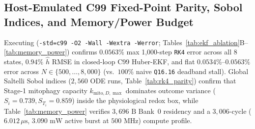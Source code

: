 \documentclass[11pt]{article}
\theoremstyle{plain}
\theoremstyle{remark}
\begin{document}
\subsection{Host-Emulated C99 Fixed-Point Parity, Sobol Indices, and Memory/Power Budget}
Executing  (\texttt{-std=c99 -O2 -Wall -Wextra -Werror}; Tables~\ref{tab:ekf_ablation}B--\ref{tab:memory_power}) confirms $0.0563\%$ max 1,000-step \texttt{RK4} error across all 8 states, $0.94\%$ $\hat{h}$ RMSE in closed-loop C99 Huber-EKF, and flat $0.0534\%\text{--}0.0563\%$ error across $N \in \{500, \dots, 8{,}000\}$ (vs.\ $100\%$ naive \texttt{Q16.16} deadband stall). Global Saltelli Sobol indices \cite{saltelli2010variance} ($2{,}560$ ODE runs, Table~\ref{tab:rk4_parity}) confirm that Stage-1 mitophagy capacity $k_{\mathrm{mito},D,\max}$ dominates outcome variance ($S_i = 0.739, S_{T_i} = 0.859$) inside the physiological redox box, while Table~\ref{tab:memory_power} verifies $3{,}696\text{ B}$ Bank~0 residency and a $3{,}006$-cycle ($6.012\,\mu\text{s}$, $3.090\text{ mW}$ active burst at $500\text{ MHz}$) compute profile.
\end{document}
